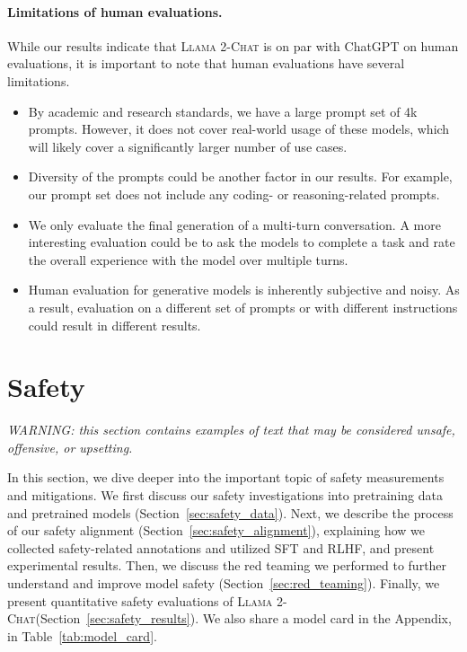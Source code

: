 \documentclass{article}
\newcommand{\modelname}{\textsc{Llama 2-Chat}\xspace}
\begin{document}
\paragraph{Limitations of human evaluations.}

While our results indicate that \modelname is on par with ChatGPT on human evaluations, it is important to note that human evaluations have several limitations.

\begin{itemize}[leftmargin=*]
    \item By academic and research standards, we have a large prompt set of 4k prompts. However, it does not cover real-world usage of these models, which will likely cover a significantly larger number of use cases.
    \item Diversity of the prompts could be another factor in our results. For example, our prompt set does not include any coding- or reasoning-related prompts.
    \item We only evaluate the final generation of a multi-turn conversation. A more interesting evaluation could be to ask the models to complete a task and rate the overall experience with the model over multiple turns.
    \item Human evaluation for generative models is inherently subjective and noisy. As a result, evaluation on a different set of prompts or with different instructions could result in different results. 
\end{itemize}

\section{Safety}
\label{sec:safety_section}

{\color{olive}\textit{WARNING: this section contains examples of text that may be considered unsafe, offensive, or upsetting.}}

In this section, we dive deeper into the important topic of safety measurements and mitigations. We first discuss our safety investigations into pretraining data and pretrained models (Section~\ref{sec:safety_data}).
Next, we describe the process of our safety alignment (Section~\ref{sec:safety_alignment}), explaining how we collected safety-related annotations and utilized SFT and RLHF, and present experimental results. Then, we discuss the red teaming we performed to further understand and improve model safety (Section~\ref{sec:red_teaming}). 
Finally, we present quantitative safety evaluations of \modelname (Section~\ref{sec:safety_results}). We also share a model card in the Appendix, in Table~\ref{tab:model_card}.
\end{document}
